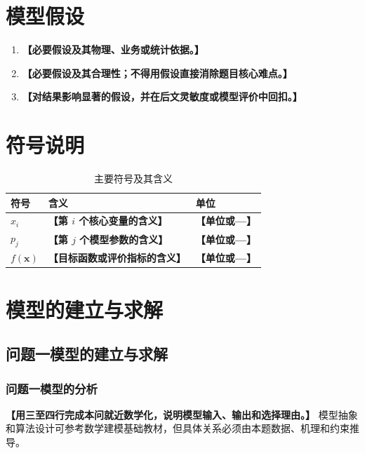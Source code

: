 \documentclass[UTF8,a4paper,12pt,zihao=-4]{ctexart}
\newcommand{\TemplateField}[1]{\textbf{【#1】}}
\begin{document}
\section{模型假设}
\begin{enumerate}[label=\textbf{假设\arabic*.}]
  \item \TemplateField{必要假设及其物理、业务或统计依据。}
  \item \TemplateField{必要假设及其合理性；不得用假设直接消除题目核心难点。}
  \item \TemplateField{对结果影响显著的假设，并在后文灵敏度或模型评价中回扣。}
\end{enumerate}

\section{符号说明}
\begin{table}[htbp]
  \centering
  \caption{主要符号及其含义}
  \label{tab:symbols}
  \begin{tabularx}{0.88\textwidth}{>{\centering\arraybackslash}p{}X>{\centering\arraybackslash}p{}}
    \toprule[1.2pt]
    符号 & 含义 & 单位 \\
    \midrule[0.8pt]
    $x_i$ & \TemplateField{第 $i$ 个核心变量的含义} & \TemplateField{单位或—} \\
    $p_j$ & \TemplateField{第 $j$ 个模型参数的含义} & \TemplateField{单位或—} \\
    $f(\symbf{x})$ & \TemplateField{目标函数或评价指标的含义} & \TemplateField{单位或—} \\
    \bottomrule[1.2pt]
  \end{tabularx}
\end{table}

\section{模型的建立与求解}

\subsection{问题一模型的建立与求解}

\subsubsection{问题一模型的分析}
\TemplateField{用三至四行完成本问就近数学化，说明模型输入、输出和选择理由。}
模型抽象和算法设计可参考数学建模基础教材\cite{modelbook,algobook}，但具体关系必须由本题数据、机理和约束推导。
\end{document}
